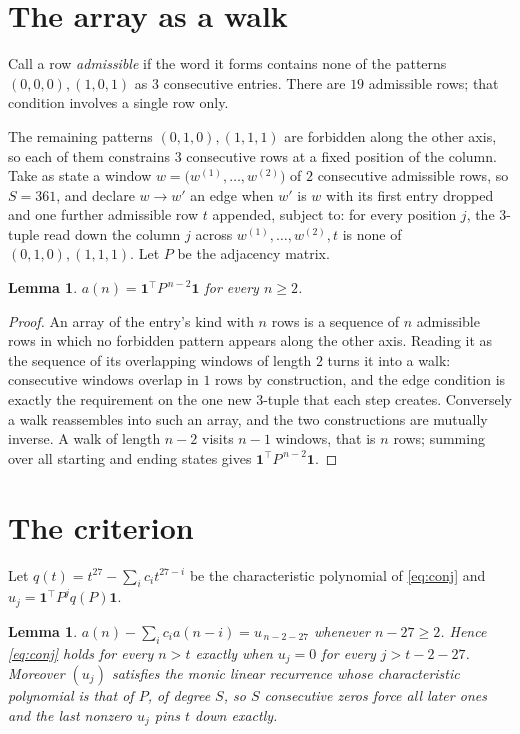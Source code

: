 \documentclass[11pt,a4paper]{article}
\theoremstyle{plain}
\newtheorem{lemma}[theorem]{Lemma}
\theoremstyle{definition}
\begin{document}
\section{The array as a walk}

Call a row \emph{admissible} if the word it forms contains none of the patterns
$(0,0,0), (1,0,1)$ as $3$ consecutive entries. There are $19$ admissible rows; that condition
involves a single row only.

The remaining patterns $(0,1,0), (1,1,1)$ are forbidden along the other axis, so each of them
constrains $3$ consecutive rows at a fixed position of the column. Take as state a
window $w=\bigl(w^{(1)},\dots,w^{(2)}\bigr)$ of $2$ consecutive admissible
rows, so $S=361$, and declare $w\to w'$ an edge when $w'$ is $w$ with its first entry
dropped and one further admissible row $t$ appended, subject to: for every position
$j$, the $3$-tuple read down the column $j$ across $w^{(1)},\dots,w^{(2)},t$
is none of $(0,1,0), (1,1,1)$. Let $P$ be the adjacency matrix.

\begin{lemma}\label{lem:walk}
$a(n)=\mathbf{1}^{\!\top}P^{\,n-2}\mathbf{1}$ for every $n\ge2$.
\end{lemma}

\begin{proof}
An array of the entry's kind with $n$ rows is a sequence of $n$ admissible rows in
which no forbidden pattern appears along the other axis. Reading it as the sequence of its
overlapping windows of length $2$ turns it into a walk: consecutive windows overlap in
$1$ rows by construction, and the edge condition is exactly the requirement on the one
new $3$-tuple that each step creates. Conversely a walk reassembles into such an array,
and the two constructions are mutually inverse. A walk of length $n-2$ visits $n-1$
windows, that is $n$ rows; summing over all starting and ending states gives
$\mathbf{1}^{\!\top}P^{\,n-2}\mathbf{1}$.
\end{proof}

\section{The criterion}

Let $q(t)=t^{27}-\sum_i c_i t^{27-i}$ be the characteristic polynomial of
\eqref{eq:conj} and $u_j=\mathbf{1}^{\!\top}P^{j}q(P)\mathbf{1}$.

\begin{lemma}\label{lem:crit}
$a(n)-\sum_i c_i a(n-i)=u_{\,n-2-27}$ whenever $n-27\ge2$. Hence
\eqref{eq:conj} holds for every $n>t$ exactly when $u_j=0$ for every
$j>t-2-27$. Moreover $(u_j)$ satisfies the monic linear recurrence whose
characteristic polynomial is that of $P$, of degree $S$, so $S$ consecutive zeros force all
later ones and the last nonzero $u_j$ pins $t$ down exactly.
\end{lemma}
\end{document}
